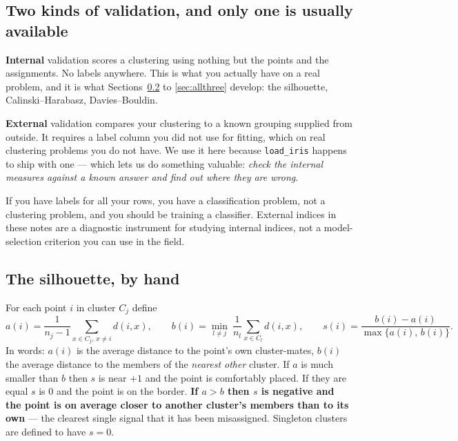 \documentclass[11pt]{article}
\begin{document}
\subsection{Two kinds of validation, and only one is usually available}

\textbf{Internal} validation scores a clustering using nothing but the points
and the assignments. No labels anywhere. This is what you actually have on a
real problem, and it is what Sections~\ref{sec:silhand} to \ref{sec:allthree}
develop: the silhouette, Calinski--Harabasz, Davies--Bouldin.

\textbf{External} validation compares your clustering to a known grouping
supplied from outside. It requires a label column you did not use for
fitting, which on real clustering problems you do not have. We use it here
because \texttt{load\_iris} happens to ship with one --- which lets us do
something valuable: \emph{check the internal measures against a known answer
and find out where they are wrong}.

\begin{caution}
If you have labels for all your rows, you have a classification problem, not a
clustering problem, and you should be training a classifier. External indices
in these notes are a diagnostic instrument for studying internal indices, not
a model-selection criterion you can use in the field.
\end{caution}

\subsection{The silhouette, by hand}
\label{sec:silhand}

For each point $i$ in cluster $C_j$ define
\begin{equation}
  a(i) = \frac{1}{n_j - 1}\!\!\sum_{x \in C_j,\, x \neq i}\!\! d(i, x),
  \qquad
  b(i) = \min_{l \neq j}\ \frac{1}{n_l}\sum_{x \in C_l} d(i, x),
  \qquad
  s(i) = \frac{b(i) - a(i)}{\max\{a(i),\, b(i)\}} .
  \label{eq:sil}
\end{equation}
In words: $a(i)$ is the average distance to the point's own cluster-mates,
$b(i)$ the average distance to the members of the \emph{nearest other}
cluster. If $a$ is much smaller than $b$ then $s$ is near $+1$ and the point
is comfortably placed. If they are equal $s$ is $0$ and the point is on the
border. \textbf{If $a > b$ then $s$ is negative and the point is on average
closer to another cluster's members than to its own} --- the clearest single
signal that it has been misassigned. Singleton clusters are defined to have
$s = 0$.
\end{document}
